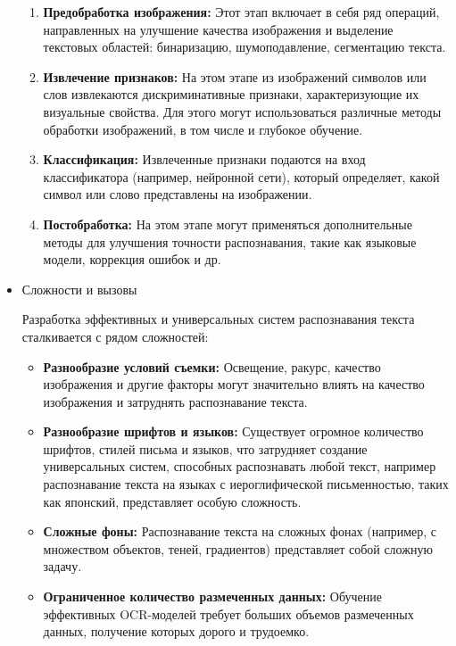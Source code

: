 \begin{itemize}
    \begin{enumerate}
        \item \textbf{Предобработка изображения:}  Этот  этап  включает  в  себя  ряд  операций,  направленных  на  улучшение  качества  изображения  и  выделение  текстовых  областей:  бинаризацию,  шумоподавление,  сегментацию  текста.
        \item \textbf{Извлечение признаков:}  На  этом  этапе  из  изображений  символов  или  слов  извлекаются  дискриминативные  признаки,  характеризующие  их  визуальные  свойства.  Для  этого  могут  использоваться  различные  методы  обработки  изображений,  в  том  числе  и  глубокое  обучение. 
        \item \textbf{Классификация:}  Извлеченные  признаки  подаются  на  вход  классификатора  (например,  нейронной  сети),  который  определяет,  какой  символ  или  слово  представлены  на  изображении. 
        \item \textbf{Постобработка:}  На  этом  этапе  могут  применяться  дополнительные  методы  для  улучшения  точности  распознавания,  такие  как  языковые  модели,  коррекция  ошибок  и  др. 
    \end{enumerate}

    \item{Сложности и вызовы}

    Разработка  эффективных  и  универсальных  систем  распознавания  текста  сталкивается  с  рядом  сложностей:

    \begin{itemize}
        \item \textbf{Разнообразие  условий  съемки:}  Освещение,  ракурс,  качество  изображения  и  другие  факторы  могут  значительно  влиять  на  качество  изображения  и  затруднять  распознавание  текста. 
        \item \textbf{Разнообразие  шрифтов  и  языков:}  Существует  огромное  количество  шрифтов,  стилей  письма  и  языков,  что  затрудняет  создание  универсальных  систем,  способных  распознавать  любой  текст, например распознавание  текста на  языках  с  иероглифической  письменностью,  таких как  японский,  представляет  особую  сложность. 
        \item \textbf{Сложные  фоны:}  Распознавание  текста  на  сложных  фонах  (например,  с  множеством  объектов,  теней,  градиентов)  представляет  собой  сложную  задачу.
        \item \textbf{Ограниченное количество размеченных данных:}  Обучение  эффективных  OCR-моделей требует  больших объемов размеченных данных,  получение которых  дорого  и трудоемко. 
    \end{itemize}
\end{itemize}
